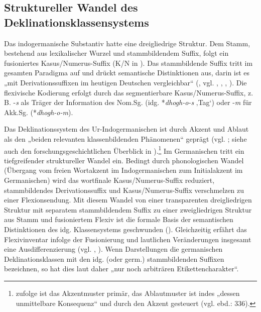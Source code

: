 \subsection{Struktureller Wandel des Deklinationsklassensystems}
\label{sec:3.1.1}
Das indogermanische Substantiv hatte eine dreigliedrige Struktur. Dem Stamm, bestehend aus lexikalischer Wurzel und stammbildendem Suffix, folgt ein fusioniertes Kasus/Numerus-Suffix (K/N in ). Das stammbildende Suffix tritt im gesamten Paradigma auf und drückt semantische Distinktionen aus, darin ist es „mit Derivationssuffixen im heutigen Deutschen vergleichbar“ (\citealt[45]{KürschnerDammel2013}, vgl. \citealt[76]{Fortson2007}, \citealt[72]{Kürschner2008a}, \citealt[325]{Meier-Brügger2010}, \citealt[61--62]{Ramat1981}). Die flexivische Kodierung erfolgt durch das segmentierbare Kasus/Numerus-Suffix, z.\,B. -\textit{s} als Träger der Information des Nom.Sg. (idg. *\textit{dhogh-o-s} ‚Tag‘) oder -\textit{m} für Akk.Sg. (*\textit{dhogh-o-m}).

Das Deklinationssystem des Ur-Indogermanischen ist durch Akzent und Ablaut als den „beiden relevanten klassenbildenden Phänomenen“ \citep[329]{Meier-Brügger2010} geprägt (vgl. \citealt[73--74 und 107--110]{Fortson2007}; siehe auch den forschungsgeschichtlichen Überblick in \citealt[336--348]{Meier-Brügger2010}).\footnote{\citet[340]{Meier-Brügger2010} zufolge ist das Akzentmuster primär, das Ablautmuster ist indes „dessen unmittelbare Konsequenz“ und durch den Akzent gesteuert (vgl. ebd.: 336).}  Im Germanischen tritt ein tiefgreifender struktureller Wandel ein. Bedingt durch phonologischen Wandel (Übergang vom freien Wortakzent im Indogermanischen zum Initialakzent im Germanischen) wird das wortfinale Kasus/Numerus-Suffix reduziert, stammbildendes Derivationssuffix und Kasus/Numerus-Suffix verschmelzen zu einer Flexionsendung. Mit diesem Wandel von einer transparenten dreigliedrigen Struktur mit separatem stammbildendem Suffix zu einer zweigliedrigen Struktur aus Stamm und fusioniertem Flexiv ist die formale Basis der semantischen Distinktionen des idg. Klassensystems geschwunden (\citealt[45]{KürschnerDammel2013}). Gleichzeitig erfährt das Flexivinventar infolge der Fusionierung und lautlichen Veränderungen insgesamt eine Ausdifferenzierung (vgl. \citealt[47]{Nübling2005}, \citealt[109--110]{Werner1969}). Wenn Darstellungen die germanischen Deklinationsklassen mit den idg. (oder germ.) stammbildenden Suffixen bezeichnen, so hat dies laut \citet[73]{Kürschner2008a} daher „nur noch arbiträren Etikettencharakter“.

